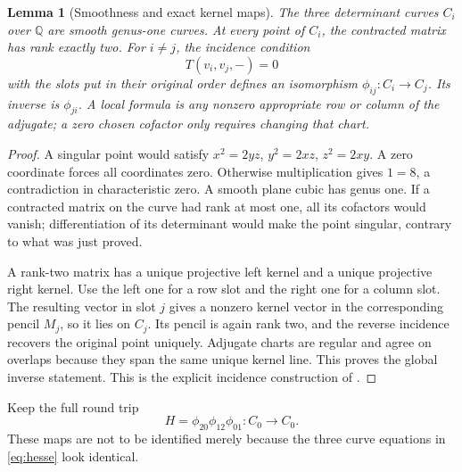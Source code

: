 \documentclass[11pt,reqno]{amsart}
\newtheorem{lemma}[theorem]{Lemma}
\theoremstyle{definition}\newtheorem{definition}[theorem]{Definition}
\theoremstyle{remark}\newtheorem{remark}[theorem]{Remark}
\newcommand{\Q}{\mathbb Q}\newcommand{\R}{\mathbb R}\newcommand{\C}{\mathbb C}\newcommand{\Z}{\mathbb Z}\newcommand{\OO}{\mathbb O}
\begin{document}
\begin{lemma}[Smoothness and exact kernel maps]\label{lem:kernel}
The three determinant curves $C_i$ over $\Q$ are smooth genus-one curves.
At every point of $C_i$, the contracted matrix has rank exactly two. For
$i\ne j$, the incidence condition
\[
 T(v_i,v_j,-)=0
\]
with the slots put in their original order defines an isomorphism
$\phi_{ij}:C_i\to C_j$. Its inverse is $\phi_{ji}$. A local formula is any
nonzero appropriate row or column of the adjugate; a zero chosen cofactor
only requires changing that chart.
\end{lemma}
\begin{proof}
A singular point would satisfy $x^2=2yz$, $y^2=2xz$, $z^2=2xy$.
A zero coordinate forces all coordinates zero. Otherwise multiplication gives
$1=8$, a contradiction in characteristic zero. A smooth plane cubic has genus
one. If a contracted matrix on the curve had rank at most one, all its
cofactors would vanish; differentiation of its determinant would make the
point singular, contrary to what was just proved.

A rank-two matrix has a unique projective left kernel and a unique projective
right kernel. Use the left one for a row slot and the right one for a column
slot. The resulting vector in slot $j$ gives a nonzero kernel vector in the
corresponding pencil $M_j$, so it lies on $C_j$. Its pencil is again rank two,
and the reverse incidence recovers the original point uniquely. Adjugate
charts are regular and agree on overlaps because they span the same unique
kernel line. This proves the global inverse statement. This is the explicit
incidence construction of \cite[\S\S3.2.2, 5.1.1]{BH}.
\end{proof}

Keep the full round trip
\[
 H=\phi_{20}\phi_{12}\phi_{01}:C_0\longrightarrow C_0.
\]
These maps are not to be identified merely because the three curve equations
in \eqref{eq:hesse} look identical.
\end{document}
